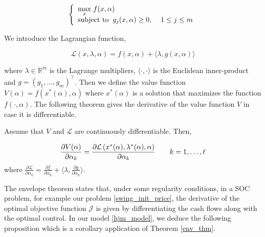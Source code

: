 \documentclass{article}
\numberwithin{equation}{section}
\begin{document}
$$
\left\{
    \begin{array}{ll}
        \underset{x}{\max} \hspace{0.1cm} f(x, \alpha)\\
        \text{subject to} \hspace{0.2cm} g_{j}(x,\alpha) \ge 0, \hspace{0.4cm} 1 \le j \le m
    \end{array}
\right.
$$

\noindent
We introduce the Lagrangian function,

$$\mathcal{L}\left(x, \lambda, \alpha \right) = f(x, \alpha) + \langle\lambda, g(x, \alpha) \rangle $$

\noindent
where $\lambda \in \mathbb{R}^{m}$ is the Lagrange multipliers, $\langle \cdot,\cdot \rangle$ is the Euclidean inner-product and $g = (g_1, \ldots, g_m)^\top$. Then we define the value function $V(\alpha) = f(x^{*}(\alpha), \alpha)$ where $x^{*}(\alpha)$ is a solution that maximizes the function $f(\cdot, \alpha)$. The following theorem gives the derivative of the value function $V$ in case it is differentiable.

\begin{theorem}
\label{env_thm}
Assume that $V$ and $\mathcal {L}$ are continuously differentiable. Then,

$$\frac{\partial V(\alpha)}{\partial \alpha_k} = \frac{\partial \mathcal{L}\left(x^{*}(\alpha), \lambda^{*}(\alpha), \alpha  \right)}{\partial \alpha_k} \hspace{0.7cm} k=1,\ldots,\ell$$
\noindent
where $\frac{\partial \mathcal{L}}{\partial \alpha_k} = \frac{\partial f}{\partial \alpha_k} + \langle\lambda, \frac{\partial g}{\partial \alpha_k}\rangle.$

\end{theorem}

The envelope theorem states that, under some regularity conditions, in a SOC problem, for example our problem \eqref{swing_init_price}, the derivative of the optimal objective function $\mathcal{J}$ is given by differentiating the cash flows along with the optimal control. In our model \eqref{hjm_model}, we deduce the following proposition which is a corollary application of Theorem \ref{env_thm}.
\end{document}

